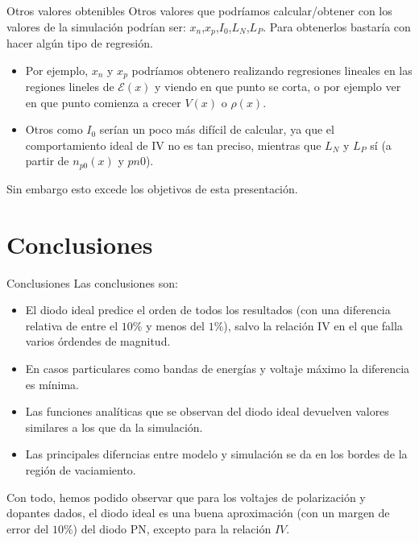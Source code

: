 \documentclass[aspectratio=169,xcolor=dvipsnames]{beamer}
\newcommand{\Ecal}{\mathcal{E}}
\begin{document}
\begin{frame}{Otros valores obtenibles}
    Otros valores que podríamos calcular/obtener con los valores de la simulación podrían ser: $x_n$,$x_p$,$I_0$,$L_N$,$L_P$. Para obtenerlos bastaría con hacer algún tipo de regresión. \\
    \begin{itemize}

    \item Por ejemplo, $x_n$ y $x_p$ podríamos obtenero realizando regresiones lineales en las regiones lineles de $\Ecal(x)$ y viendo en que punto se corta, o por ejemplo ver en que punto comienza a crecer $V(x)$ o $\rho(x)$. 

    \item Otros como $I_0$ serían un poco más difícil de calcular, ya que el comportamiento ideal de IV no es tan preciso, mientras que $L_N$ y $L_P$ sí (a partir de $n_{p0}(x)$ y $p{n0}$). \\

    \end{itemize}

    Sin embargo esto excede los objetivos de esta presentación.
\end{frame}

\section{Conclusiones}

\begin{frame}{Conclusiones}
    Las conclusiones son:     
    \begin{itemize}
        \item El diodo ideal predice el orden de todos los resultados (con una diferencia relativa de entre el $10\%$ y menos del $1\%$), salvo la relación IV en el que falla varios órdendes de magnitud.
        \item En casos particulares como bandas de energías y voltaje máximo la diferencia es mínima.
        \item Las funciones analíticas que se observan del diodo ideal devuelven valores similares a los que da la simulación.
        \item Las principales diferncias entre modelo y simulación se da en los bordes de la región de vaciamiento.
    \end{itemize}
    Con todo, hemos podido observar que para los voltajes de polarización y dopantes dados, el diodo ideal es una buena aproximación (con un margen de error del $10\%$) del diodo PN, excepto para la relación $IV$. 
\end{frame}
\end{document}
